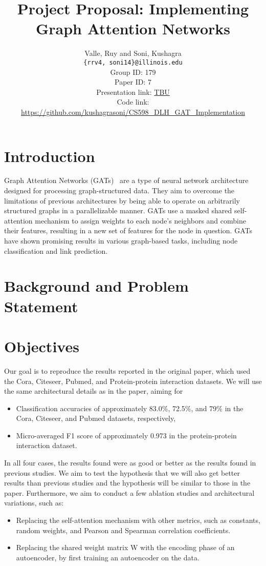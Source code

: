 \documentclass{article}
\title{Project Proposal: Implementing Graph Attention Networks}
\author
{Valle, Ruy and Soni, Kushagra \\
    \texttt{\{rrv4, soni14\}@illinois.edu}
    \\[2em]
    Group ID: 179\\
    Paper ID: 7\\
    Presentation link: \url{TBU} \\
    Code link: \url{https://github.com/kushagrasoni/CS598_DLH_GAT_Implementation}
    \\[2em]
}
\begin{document}
    \maketitle

    \section{Introduction}\label{sec:introduction}

    Graph Attention Networks (GATs)~\cite{velickovic2018graph} are a type of neural network architecture designed for
    processing graph-structured data.
    They aim to overcome the limitations of previous architectures by being able to operate on arbitrarily structured graphs in a parallelizable manner.
    GATs use a masked shared self-attention mechanism to assign weights to each node's neighbors and combine their features, resulting in a new set of features for the node in question.
    GATs have shown promising results in various graph-based tasks, including node classification and link prediction.


    \section{Background and Problem Statement}\label{sec:background-and-problem-statement}
    

    \section{Objectives}\label{sec:objectives}
    Our goal is to reproduce the results reported in the original paper, which used the Cora, Citeseer, Pubmed, and Protein-protein interaction datasets.
    We will use the same architectural details as in the paper, aiming for
    \begin{itemize}
        \item Classification accuracies of approximately 83.0\%, 72.5\%, and 79\% in the Cora, Citeseer, and Pubmed
        datasets, respectively,
        \item Micro-averaged F1 score of approximately 0.973 in the protein-protein interaction dataset.
    \end{itemize}

    In all four cases, the results found were as good or better as the results found in previous studies.
    We aim to test the hypothesis that we will also get better results than previous studies and the hypothesis will
    be similar to those in the paper.
    Furthermore, we aim to conduct a few ablation studies and architectural
    variations, such as:
    \begin{itemize}
        \item Replacing the self-attention mechanism with other metrics, such as
    constants, random weights, and Pearson and Spearman correlation
    coefficients.
        \item Replacing the shared weight matrix W with the encoding phase of an
    autoencoder, by first training an autoencoder on the data.
    \end{itemize}
\end{document}
